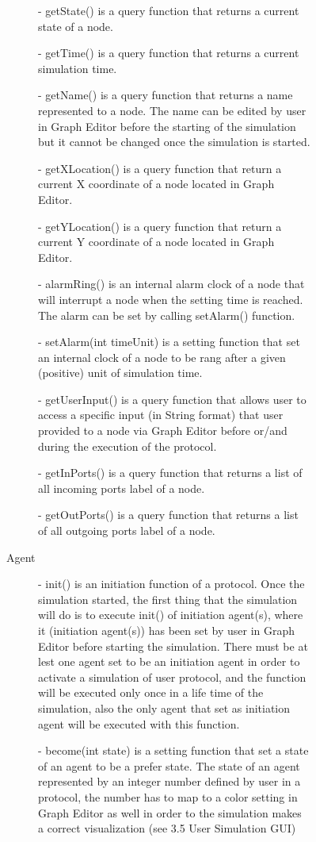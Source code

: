 \begin{description}
\begin{description}
\begin{description}
\begin{description}
- getState() is a query function that returns a current state of a node.

- getTime() is a query function that returns a current simulation time.

- getName() is a query function that returns a name represented to a node. The name can be edited by user in Graph Editor before the starting of the simulation but it cannot be changed once the simulation is started.

- getXLocation() is a query function that return a current X coordinate of a node located in Graph Editor.

- getYLocation() is a query function that return a current Y coordinate of a node located in Graph Editor.

- alarmRing() is an internal alarm clock of a node that will interrupt a node when the setting time is reached. The alarm can be set by calling setAlarm() function.

- setAlarm(int timeUnit) is a setting function that set an internal clock of a node to be rang after a given (positive) unit of simulation time.

- getUserInput() is a query function that allows user to access a specific input (in String format) that user provided to a node via Graph Editor before or/and during the execution of the protocol.

- getInPorts() is a query function that returns a list of all incoming ports label of a node.

- getOutPorts() is a query function that returns a list of all outgoing ports label of a node.


\item[Agent]

- init() is an initiation function of a protocol. Once the simulation started, the first thing that the simulation will do is to execute init() of initiation agent(s), where it (initiation agent(s)) has been set by user in Graph Editor before starting the simulation. There must be at lest one agent set to be an initiation agent in order to activate a simulation of user protocol, and the function will be executed only once in a life time of the simulation, also the only agent that set as initiation agent will be executed with this function.


- become(int state) is a setting function that set a state of an agent to be a prefer state. The state of an agent represented by an integer number defined by user in a protocol, the number has to map to a color setting in Graph Editor as well in order to the simulation makes a correct visualization (see 3.5 User Simulation GUI)


\end{description}
\end{description}
\end{description}
\end{description}
